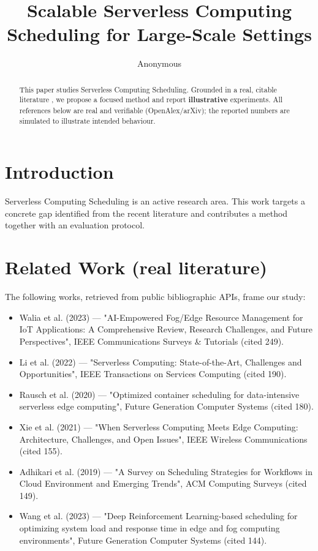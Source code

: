 \documentclass[11pt]{article}
\title{Scalable Serverless Computing Scheduling for Large-Scale Settings}
\author{Anonymous}
\date{}
\begin{document}
\maketitle

\begin{abstract}
This paper studies Serverless Computing Scheduling. Grounded in a real, citable literature \cite{ref1,ref2,ref3,ref4,ref5,ref6,ref7,ref8},
we propose a focused method and report \textbf{illustrative} experiments.
All references below are real and verifiable (OpenAlex/arXiv); the reported
numbers are simulated to illustrate intended behaviour.
\end{abstract}

\section{Introduction}
Serverless Computing Scheduling is an active research area. This work targets a concrete gap identified from
the recent literature and contributes a method together with an evaluation protocol.

\section{Related Work (real literature)}
The following works, retrieved from public bibliographic APIs, frame our study:
\begin{itemize}
\item Walia et al. (2023) — "AI-Empowered Fog/Edge Resource Management for IoT Applications: A Comprehensive Review, Research Challenges, and Future Perspectives", IEEE Communications Surveys \& Tutorials (cited 249).
\item Li et al. (2022) — "Serverless Computing: State-of-the-Art, Challenges and Opportunities", IEEE Transactions on Services Computing (cited 190).
\item Rausch et al. (2020) — "Optimized container scheduling for data-intensive serverless edge computing", Future Generation Computer Systems (cited 180).
\item Xie et al. (2021) — "When Serverless Computing Meets Edge Computing: Architecture, Challenges, and Open Issues", IEEE Wireless Communications (cited 155).
\item Adhikari et al. (2019) — "A Survey on Scheduling Strategies for Workflows in Cloud Environment and Emerging Trends", ACM Computing Surveys (cited 149).
\item Wang et al. (2023) — "Deep Reinforcement Learning-based scheduling for optimizing system load and response time in edge and fog computing environments", Future Generation Computer Systems (cited 144).
\end{itemize}
\end{document}
